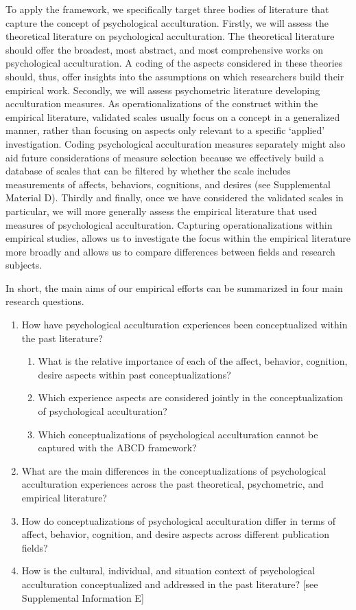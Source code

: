 \documentclass[man, 12pt, a4paper, mask]{apa7}
\begin{document}
To apply the framework, we specifically target three bodies of literature that capture the concept of psychological acculturation. Firstly, we will assess the theoretical literature on psychological acculturation. The theoretical literature should offer the broadest, most abstract, and most comprehensive works on psychological acculturation. A coding of the aspects considered in these theories should, thus, offer insights into the assumptions on which researchers build their empirical work.
Secondly, we will assess psychometric literature developing acculturation measures. As operationalizations of the construct within the empirical literature, validated scales usually focus on a concept in a generalized manner, rather than focusing on aspects only relevant to a specific `applied' investigation. Coding psychological acculturation measures separately might also aid future considerations of measure selection because we effectively build a database of scales that can be filtered by whether the scale includes measurements of affects, behaviors, cognitions, and desires (see Supplemental Material D). 
Thirdly and finally, once we have considered the validated scales in particular, we will more generally assess the empirical literature that used measures of psychological acculturation. Capturing operationalizations within empirical studies, allows us to investigate the focus within the empirical literature more broadly and allows us to compare differences between fields and research subjects.

In short, the main aims of our empirical efforts can be summarized in four main research questions.
\begin{enumerate}[noitemsep,topsep=0pt,label=RQ \arabic*:,leftmargin=1.8cm]
    \item How have psychological acculturation experiences been conceptualized within the past literature?
    \begin{enumerate}[noitemsep,topsep=0pt,label=(RQ 1\alph*):,leftmargin=1.64cm]
        \item What is the relative importance of each of the affect, behavior, cognition, desire aspects within past conceptualizations?
        \item Which experience aspects are considered jointly in the conceptualization of psychological acculturation?
        \item Which conceptualizations of psychological acculturation cannot be captured with the ABCD framework?
    \end{enumerate}
    \item What are the main differences in the conceptualizations of psychological acculturation experiences across the past theoretical, psychometric, and empirical literature?
    \item How do conceptualizations of psychological acculturation differ in terms of affect, behavior, cognition, and desire aspects across different publication fields?
    \item How is the cultural, individual, and situation context of psychological acculturation conceptualized and addressed in the past literature? [see Supplemental Information E]
\end{enumerate}
\end{document}
